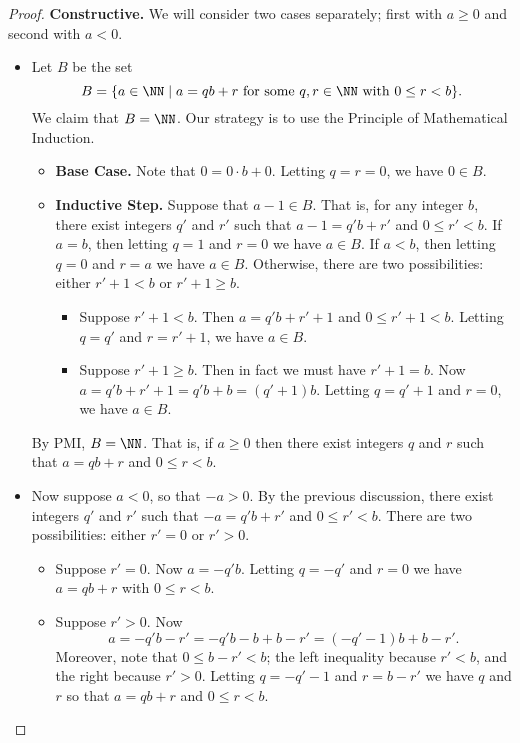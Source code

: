\documentclass{article}
\begin{document}
\begin{proof}
\textbf{Constructive.} We will consider two cases separately; first with $a \geq 0$ and second with $a < 0$.

\begin{itemize}
\item Let $B$ be the set \[ B = \{ a \in \NN \mid a = qb + r\ \mathrm{for\ some}\ q,r \in \NN\ \mathrm{with}\ 0 \leq r < b \}. \] We claim that $B = \NN$. Our strategy is to use the Principle of Mathematical Induction.
\begin{itemize}
\item \textbf{Base Case.} Note that $0 = 0 \cdot b + 0$. Letting $q = r = 0$, we have $0 \in B$.
\item \textbf{Inductive Step.} Suppose that $a-1 \in B$. That is, for any integer $b$, there exist integers $q'$ and $r'$ such that $a-1 = q'b + r'$ and $0 \leq r' < b$. If $a = b$, then letting $q = 1$ and $r = 0$ we have $a \in B$. If $a < b$, then letting $q = 0$ and $r = a$ we have $a \in B$. Otherwise, there are two possibilities: either $r'+1 < b$ or $r'+1 \geq b$.
\begin{itemize}
\item Suppose $r'+1 < b$. Then $a = q'b + r'+1$ and $0 \leq r'+1 < b$. Letting $q = q'$ and $r = r'+1$, we have $a \in B$.
\item Suppose $r'+1 \geq b$. Then in fact we must have $r'+1 = b$. Now $a = q'b + r'+1 = q'b + b = (q'+1)b$. Letting $q = q'+1$ and $r = 0$, we have $a \in B$.
\end{itemize}
\end{itemize}
By PMI, $B = \NN$. That is, if $a \geq 0$ then there exist integers $q$ and $r$ such that $a = qb + r$ and $0 \leq r < b$.

\item Now suppose $a < 0$, so that $-a > 0$. By the previous discussion, there exist integers $q'$ and $r'$ such that $-a = q'b + r'$ and $0 \leq r' < b$. There are two possibilities: either $r' = 0$ or $r' > 0$.
\begin{itemize}
\item Suppose $r' = 0$. Now $a = -q'b$. Letting $q = -q'$ and $r = 0$ we have $a = qb+r$ with $0 \leq r < b$.
\item Suppose $r' > 0$. Now \[ a = -q'b - r'= -q'b - b + b - r' = (-q'-1)b + b-r'. \] Moreover, note that $0 \leq b-r' < b$; the left inequality because $r' < b$, and the right because $r' > 0$. Letting $q = -q'-1$ and $r = b-r'$ we have $q$ and $r$ so that $a = qb+r$ and $0 \leq r < b$. \qedhere
\end{itemize}
\end{itemize}
\end{proof}
\end{document}
